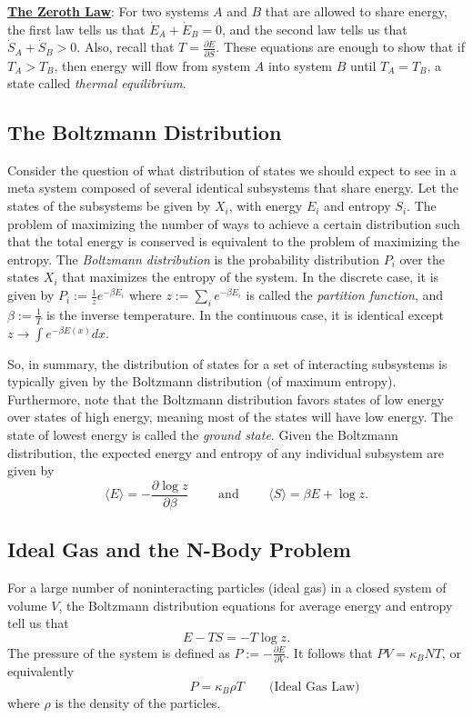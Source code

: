 \documentclass[12pt]{article}
\begin{document}
\underline{\bf The Zeroth Law}:
For two systems $A$ and $B$ that are allowed to share energy, the first law
tells us that $\dot{E}_A + \dot{E}_B = 0$, and the second law tells us that
$\dot{S}_A + \dot{S}_B > 0$.
Also, recall that $T = \frac{\partial E}{\partial S}$.
These equations are enough to show that if $T_A > T_B$, then energy will flow
from system $A$ into system $B$ until $T_A = T_B$, a state called 
{\it thermal equilibrium}.

\subsection*{The Boltzmann Distribution}

Consider the question of what distribution of states we should expect to see
in a meta system composed of several identical subsystems that share energy.
Let the states of the subsystems be given by $X_i$, with energy $E_i$ and
entropy $S_i$.
The problem of maximizing the number of ways to achieve a certain distribution
such that the total energy is conserved is equivalent to the problem of
maximizing the entropy.
The {\it Boltzmann distribution} is the probability distribution $P_i$ over
the states $X_i$ that maximizes the entropy of the system.
In the discrete case, it is given by $P_i := \frac{1}{z} e^{-\beta E_i}$ where
$z := \sum_i e^{-\beta E_i}$ is called the {\it partition function}, and
$\beta := \frac{1}{T}$ is the inverse temperature.
In the continuous case, it is identical except 
$z \rightarrow \int e^{-\beta E(x)} dx$.

So, in summary, the distribution of states for a set of interacting subsystems 
is typically given by the Boltzmann distribution (of maximum entropy).
Furthermore, note that the Boltzmann distribution favors states of low energy
over states of high energy, meaning most of the states will have low energy.
The state of lowest energy is called the {\it ground state}.
Given the Boltzmann distribution, the expected energy and entropy of any 
individual subsystem are given by
$$
\langle E \rangle = -\frac{\partial\log z}{\partial\beta}
\qquad\text{ and }\qquad
\langle S \rangle = \beta E + \log z.
$$

\subsection*{Ideal Gas and the N-Body Problem}

For a large number of noninteracting particles (ideal gas) in a closed system
of volume $V$, the Boltzmann distribution equations for average energy and
entropy tell us that
$$
E - TS = -T\log z.
$$
The pressure of the system is defined as $P := -\frac{\partial E}{\partial V}$.
It follows that $PV = \kappa_B NT$, or equivalently
$$
\qquad\qquad\qquad P = \kappa_B \rho T \qquad\text{(Ideal Gas Law)}
$$
where $\rho$ is the density of the particles.
\end{document}
